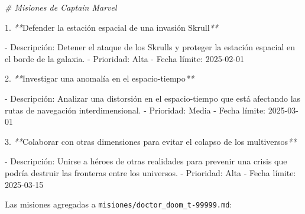 \documentclass[
]{book}
\newenvironment{Shaded}{\begin{snugshade}}{\end{snugshade}}
\newcommand{\CommentTok}[1]{\textcolor[rgb]{0.56,0.35,0.01}{\textit{#1}}}
\newcommand{\ExtensionTok}[1]{#1}
\newcommand{\NormalTok}[1]{#1}
\newcommand{\PreprocessorTok}[1]{\textcolor[rgb]{0.56,0.35,0.01}{\textit{#1}}}
\begin{document}
\begin{Shaded}
\begin{Highlighting}[]
\CommentTok{\# Misiones de Captain Marvel}

\ExtensionTok{1.} \PreprocessorTok{**}\NormalTok{Defender la estación espacial de una invasión Skrull}\PreprocessorTok{**}
   
   \ExtensionTok{{-}}\NormalTok{ Descripción: Detener el ataque de los Skrulls y proteger la estación espacial en el borde de la galaxia.}
   \ExtensionTok{{-}}\NormalTok{ Prioridad: Alta}
   \ExtensionTok{{-}}\NormalTok{ Fecha límite: 2025{-}02{-}01}

\ExtensionTok{2.} \PreprocessorTok{**}\NormalTok{Investigar una anomalía en el espacio{-}tiempo}\PreprocessorTok{**}
   
   \ExtensionTok{{-}}\NormalTok{ Descripción: Analizar una distorsión en el espacio{-}tiempo que está afectando las rutas de navegación interdimensional.}
   \ExtensionTok{{-}}\NormalTok{ Prioridad: Media}
   \ExtensionTok{{-}}\NormalTok{ Fecha límite: 2025{-}03{-}01}

\ExtensionTok{3.} \PreprocessorTok{**}\NormalTok{Colaborar con otras dimensiones para evitar el colapso de los multiversos}\PreprocessorTok{**}
   
   \ExtensionTok{{-}}\NormalTok{ Descripción: Unirse a héroes de otras realidades para prevenir una crisis que podría destruir las fronteras entre los universos.}
   \ExtensionTok{{-}}\NormalTok{ Prioridad: Alta}
   \ExtensionTok{{-}}\NormalTok{ Fecha límite: 2025{-}03{-}15}
\end{Highlighting}
\end{Shaded}

Las misiones agregadas a \texttt{misiones/doctor\_doom\_t-99999.md}:
\end{document}
